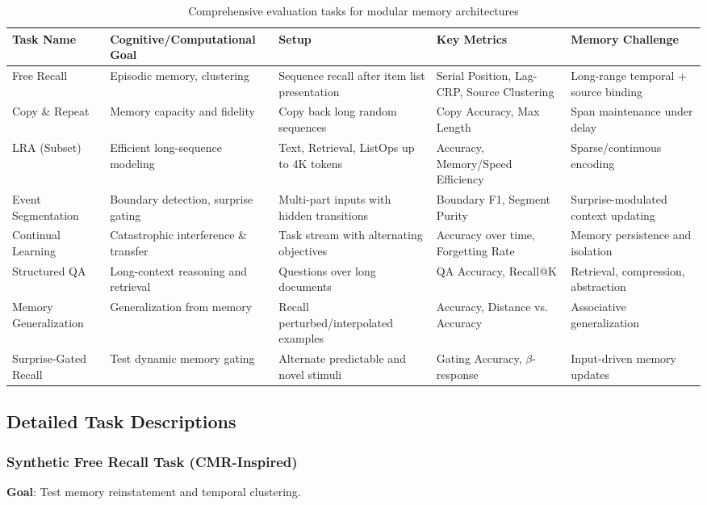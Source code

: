 \documentclass[11pt]{article}
\begin{document}
\begin{table*}[t]
\centering
\small
\begin{tabular}{@{}p{2.5cm}p{3.5cm}p{4cm}p{3cm}p{3cm}@{}}
\toprule
\textbf{Task Name} & \textbf{Cognitive/Computational Goal} & \textbf{Setup} & \textbf{Key Metrics} & \textbf{Memory Challenge} \\
\midrule
Free Recall & Episodic memory, clustering & Sequence recall after item list presentation & Serial Position, Lag-CRP, Source Clustering & Long-range temporal + source binding \\
Copy \& Repeat & Memory capacity and fidelity & Copy back long random sequences & Copy Accuracy, Max Length & Span maintenance under delay \\
LRA (Subset) & Efficient long-sequence modeling & Text, Retrieval, ListOps up to 4K tokens & Accuracy, Memory/Speed Efficiency & Sparse/continuous encoding \\
Event Segmentation & Boundary detection, surprise gating & Multi-part inputs with hidden transitions & Boundary F1, Segment Purity & Surprise-modulated context updating \\
Continual Learning & Catastrophic interference \& transfer & Task stream with alternating objectives & Accuracy over time, Forgetting Rate & Memory persistence and isolation \\
Structured QA & Long-context reasoning and retrieval & Questions over long documents & QA Accuracy, Recall@K & Retrieval, compression, abstraction \\
Memory Generalization & Generalization from memory & Recall perturbed/interpolated examples & Accuracy, Distance vs. Accuracy & Associative generalization \\
Surprise-Gated Recall & Test dynamic memory gating & Alternate predictable and novel stimuli & Gating Accuracy, $\beta$-response & Input-driven memory updates \\
\bottomrule
\end{tabular}
\caption{Comprehensive evaluation tasks for modular memory architectures}
\label{tab:eval_tasks}
\end{table*}

\subsection{Detailed Task Descriptions}

\subsubsection{Synthetic Free Recall Task (CMR-Inspired)}
\textbf{Goal}: Test memory reinstatement and temporal clustering.
\end{document}
